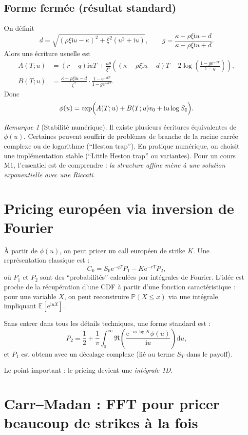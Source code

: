 \documentclass[11pt,a4paper]{report}
\newcommand{\dd}{\mathrm{d}}
\newcommand{\ee}{\mathrm{e}}
\newcommand{\ii}{\mathrm{i}}
\newcommand{\E}{\mathbb{E}}
\newcommand{\Prob}{\mathbb{P}}
\newcommand{\1}{\mathbbm{1}}
\theoremstyle{definition}
\theoremstyle{plain}
\theoremstyle{remark}
\newtheorem{remark}{Remarque}[chapter]
\begin{document}
\subsection{Forme fermée (résultat standard)}
On définit
\[
d = \sqrt{(\rho\xi\ii u-\kappa)^2 + \xi^2(u^2+\ii u)},
\qquad
g = \frac{\kappa-\rho\xi\ii u-d}{\kappa-\rho\xi\ii u+d}.
\]
Alors une écriture usuelle est
\begin{align*}
A(T;u) &= (r-q)\ii u T + \frac{\kappa\theta}{\xi^2}\left((\kappa-\rho\xi\ii u-d)T - 2\log\left(\frac{1-g\ee^{-dT}}{1-g}\right)\right),\\
B(T;u) &= \frac{\kappa-\rho\xi\ii u-d}{\xi^2}\cdot \frac{1-\ee^{-dT}}{1-g\ee^{-dT}}.
\end{align*}
Donc
\[
\phi(u)=\exp\Bigl(A(T;u)+B(T;u)v_0+\ii u\log S_0\Bigr).
\]

\begin{remark}[Stabilité numérique]
Il existe plusieurs écritures équivalentes de $\phi(u)$.
Certaines peuvent souffrir de problèmes de branche de la racine carrée complexe ou de logarithme (``Heston trap'').
En pratique numérique, on choisit une implémentation stable (``Little Heston trap'' ou variantes).
Pour un cours M1, l'essentiel est de comprendre : \emph{la structure affine mène à une solution exponentielle avec une Riccati}.
\end{remark}

\section{Pricing européen via inversion de Fourier}
\label{sec:heston_pricing}

À partir de $\phi(u)$, on peut pricer un call européen de strike $K$.
Une représentation classique est :
\[
C_0 = S_0\ee^{-qT}P_1 - K\ee^{-rT}P_2,
\]
où $P_1$ et $P_2$ sont des ``probabilités'' calculées par intégrales de Fourier.
L'idée est proche de la récupération d'une CDF à partir d'une fonction caractéristique :
pour une variable $X$, on peut reconstruire $\Prob(X\le x)$ via une intégrale impliquant $\E[\ee^{\ii u X}]$.

Sans entrer dans tous les détails techniques, une forme standard est :
\[
P_2 = \frac12 + \frac{1}{\pi}\int_0^\infty \Re\left(\frac{\ee^{-\ii u\log K}\phi(u)}{\ii u}\right)\dd u,
\]
et $P_1$ est obtenu avec un décalage complexe (lié au terme $S_T$ dans le payoff).

Le point important : le pricing devient une \emph{intégrale 1D}.

\section{Carr--Madan : FFT pour pricer beaucoup de strikes à la fois}
\label{sec:carr_madan}
\end{document}
